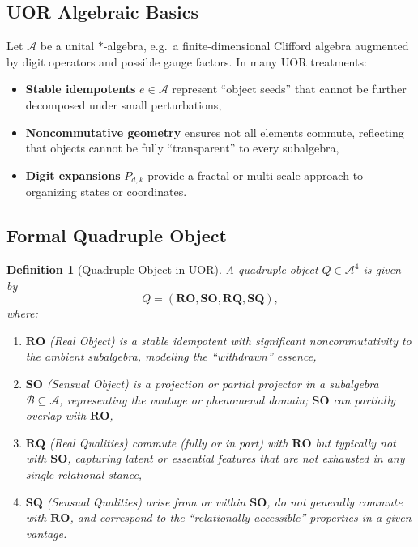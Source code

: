 \documentclass[11pt]{article}
\newtheorem{definition}[theorem]{Definition}
\begin{document}
\subsection{UOR Algebraic Basics}
Let \(\mathcal{A}\) be a unital $*$-algebra, e.g.\ a finite-dimensional Clifford algebra 
augmented by digit operators and possible gauge factors. In many UOR treatments:
\begin{itemize}[itemsep=0pt]
\item \textbf{Stable idempotents} $e\in \mathcal{A}$ represent “object seeds” 
      that cannot be further decomposed under small perturbations,
\item \textbf{Noncommutative geometry} ensures not all elements commute, 
      reflecting that objects cannot be fully “transparent” to every subalgebra,
\item \textbf{Digit expansions} $P_{d,k}$ provide a fractal or multi-scale 
      approach to organizing states or coordinates.
\end{itemize}

\subsection{Formal Quadruple Object}
\begin{definition}[Quadruple Object in UOR]
A \emph{quadruple object} $Q\in \mathcal{A}^4$ is given by 
\[
Q = (\mathbf{RO}, \mathbf{SO}, \mathbf{RQ}, \mathbf{SQ}),
\]
where:
\begin{enumerate}[itemsep=0pt,label=(\roman*)]
\item \(\mathbf{RO}\) (Real Object) is a stable idempotent with 
      significant noncommutativity to the ambient subalgebra, 
      modeling the “withdrawn” essence,
\item \(\mathbf{SO}\) (Sensual Object) is a projection or partial projector 
      in a subalgebra $\mathcal{B}\subseteq \mathcal{A}$, representing the vantage 
      or phenomenal domain; $\mathbf{SO}$ can partially overlap with $\mathbf{RO}$,
\item \(\mathbf{RQ}\) (Real Qualities) commute (fully or in part) with $\mathbf{RO}$ 
      but typically not with $\mathbf{SO}$, capturing latent or essential features 
      that are not exhausted in any single relational stance,
\item \(\mathbf{SQ}\) (Sensual Qualities) arise from or within $\mathbf{SO}$, 
      do not generally commute with $\mathbf{RO}$, and correspond to 
      the “relationally accessible” properties in a given vantage.
\end{enumerate}
\end{definition}
\end{document}
